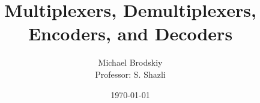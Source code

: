 


\pagestyle{fancy}

\title{Multiplexers, Demultiplexers, Encoders, and Decoders}
\date{\today}
\author{Michael Brodskiy\\ \small Professor: S. Shazli}



\maketitle

\thispagestyle{fancy}

\newpage

